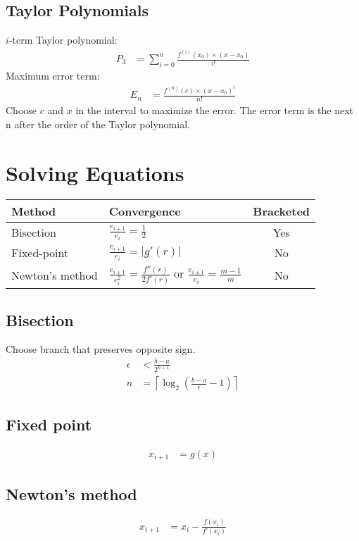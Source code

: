 \documentclass[12pt]{article}
\newcommand{\round}   [1]{\left(       #1 \right)}
\newcommand{\straight}[1]{\left|       #1 \right|}
\newcommand{\ceiling} [1]{\left\lceil  #1 \right\rceil}
\begin{document}
\subsection*{Taylor Polynomials}
$i$-term Taylor polynomial:
\begin{align*}
    P_3 &= \sum_{i=0}^n \frac{f^{(i)}(x_0) \times (x - x_0)}{i!}
\end{align*}
Maximum error term:
\begin{align*}
    E_n &= \frac{f^{(n)}(c) \times (x - x_0)^i}{n!}
\end{align*}
Choose $c$ and $x$ in the interval to maximize the error. The error term is the next n after the order of the Taylor polynomial.

\section*{Solving Equations}

\begin{center}
    \begin{tabular}{l|lc}
        Method & Convergence & Bracketed \\ \hline
        Bisection & $\frac{e_{i+1}}{e_i} = \frac{1}{2}$ & Yes \\
        Fixed-point & $\frac{e_{i+1}}{e_i} = \straight{g'(r)}$ & No \\
        Newton's method & $\frac{e_{i+1}}{e_i^2} = \frac{f''(r)}{2f'(r)}$ or $\frac{e_{i+1}}{e_i} = \frac{m - 1}{m}$ & No
    \end{tabular}
\end{center}

\subsection*{Bisection}
Choose branch that preserves opposite sign.
\begin{align*}
    \epsilon &< \frac{b - a}{2^{n + 1}} \\
    n &= \ceiling{\log_2 \round{\frac{b - a}{\epsilon} - 1}}
\end{align*}

\subsection*{Fixed point}
\begin{align*}
    x_{i + 1} &= g(x)
\end{align*}

\subsection*{Newton's method}
\begin{align*}
    x_{i + 1} &= x_i - \frac{f(x_i)}{f'(x_i)}
\end{align*}
\end{document}
